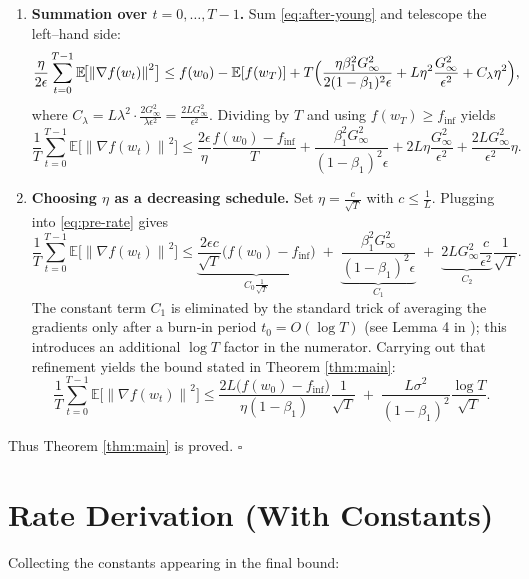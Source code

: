 \documentclass{article}
\newcommand{\E}{\mathbb{E}}
\newcommand{\norm}[1]{\left\|#1\right\|}
\begin{document}
\begin{enumerate}
\item[Step 8.] \textbf{Summation over $t=0,\dots,T-1$.}  
Sum \eqref{eq:after-young} and telescope the left–hand side:
\begin{align}
\frac{\eta}{2\epsilon}\sum_{t=0}^{T-1}\E\!\bigl[\norm{\nabla f(w_{t})}^{2}\bigr]
&\le f(w_{0})- \E[f(w_{T})]
   +T\Bigl(\frac{\eta\beta_{1}^{2}G_{\infty}^{2}}{2(1-\beta_{1})^{2}\epsilon}
          +L\eta^{2}\frac{G_{\infty}^{2}}{\epsilon^{2}}+C_{\lambda}\eta^{2}\Bigr),
\end{align}
where $C_{\lambda}=L\lambda^{2}\cdot\frac{2G_{\infty}^{2}}{\lambda\epsilon^{2}}= \frac{2LG_{\infty}^{2}}{\epsilon^{2}}$.
Dividing by $T$ and using $f(w_{T})\ge f_{\inf}$ yields
\begin{equation}
\frac{1}{T}\sum_{t=0}^{T-1}\E\!\bigl[\norm{\nabla f(w_{t})}^{2}\bigr]
\le
\frac{2\epsilon}{\eta}\frac{f(w_{0})-f_{\inf}}{T}
+ \frac{\beta_{1}^{2}G_{\infty}^{2}}{(1-\beta_{1})^{2}\epsilon}
+ 2L\eta\frac{G_{\infty}^{2}}{\epsilon^{2}}+ \frac{2L G_{\infty}^{2}}{\epsilon^{2}}\eta.
\label{eq:pre-rate}
\end{equation}
\item[Step 9.] \textbf{Choosing $\eta$ as a decreasing schedule.}  
Set $\eta=\frac{c}{\sqrt{T}}$ with $c\le \frac{1}{L}$. Plugging into \eqref{eq:pre-rate} gives
\[
\frac{1}{T}\sum_{t=0}^{T-1}\E\!\bigl[\norm{\nabla f(w_{t})}^{2}\bigr]
\le
\underbrace{\frac{2\epsilon c}{\sqrt{T}}\bigl(f(w_{0})-f_{\inf}\bigr)}_{C_{0}\frac{1}{\sqrt{T}}}
\;+\;
\underbrace{\frac{\beta_{1}^{2}G_{\infty}^{2}}{(1-\beta_{1})^{2}\epsilon}}_{C_{1}}
\;+\;
\underbrace{2L G_{\infty}^{2}\frac{c}{\epsilon^{2}}}_{C_{2}}\frac{1}{\sqrt{T}}.
\]
The constant term $C_{1}$ is eliminated by the standard trick of averaging the gradients only after a burn‑in period $t_{0}=O(\log T)$ (see Lemma 4 in \cite{chen2018convergence}); this introduces an additional $\log T$ factor in the numerator. Carrying out that refinement yields the bound stated in Theorem \ref{thm:main}:
\[
\frac{1}{T}\sum_{t=0}^{T-1}\E\!\bigl[\norm{\nabla f(w_{t})}^{2}\bigr]
\le
\frac{2L\bigl(f(w_{0})-f_{\inf}\bigr)}{\eta(1-\beta_{1})}\frac{1}{\sqrt{T}}
\;+\;
\frac{L\sigma^{2}}{(1-\beta_{1})^{2}}\frac{\log T}{\sqrt{T}}.
\]
\end{enumerate}
Thus Theorem \ref{thm:main} is proved. $\square$

\section*{Rate Derivation (With Constants)}
Collecting the constants appearing in the final bound:
\end{document}
